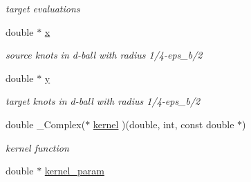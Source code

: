 \begin{CompactItemize}
\begin{CompactList}\small\item\em target evaluations \item\end{CompactList}\item 
\hypertarget{structfastsum__plan_590dd3d6fd12f3e8cbd72b8a83905760}{
double $\ast$ \hyperlink{structfastsum__plan_590dd3d6fd12f3e8cbd72b8a83905760}{x}}
\label{structfastsum__plan_590dd3d6fd12f3e8cbd72b8a83905760}

\begin{CompactList}\small\item\em source knots in d-ball with radius 1/4-eps\_\-b/2 \item\end{CompactList}\item 
\hypertarget{structfastsum__plan_79615d0f0d38b754742c3ff445b6c733}{
double $\ast$ \hyperlink{structfastsum__plan_79615d0f0d38b754742c3ff445b6c733}{y}}
\label{structfastsum__plan_79615d0f0d38b754742c3ff445b6c733}

\begin{CompactList}\small\item\em target knots in d-ball with radius 1/4-eps\_\-b/2 \item\end{CompactList}\item 
\hypertarget{structfastsum__plan_910b9b7bc966ca0241ccf8093405668d}{
double \_\-Complex($\ast$ \hyperlink{structfastsum__plan_910b9b7bc966ca0241ccf8093405668d}{kernel} )(double, int, const double $\ast$)}
\label{structfastsum__plan_910b9b7bc966ca0241ccf8093405668d}

\begin{CompactList}\small\item\em kernel function \item\end{CompactList}\item 
\hypertarget{structfastsum__plan_e494d11cd336be135f7a93d112a16852}{
double $\ast$ \hyperlink{structfastsum__plan_e494d11cd336be135f7a93d112a16852}{kernel\_\-param}}
\label{structfastsum__plan_e494d11cd336be135f7a93d112a16852}


\end{CompactItemize}
